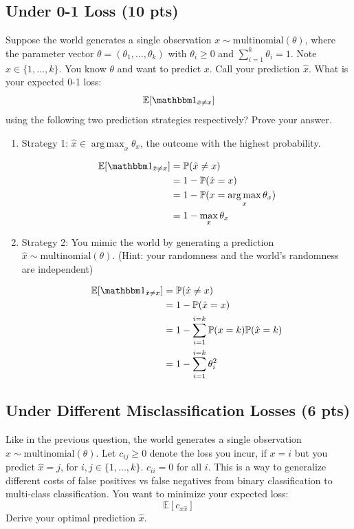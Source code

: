 \documentclass[a4paper]{article}
\theoremstyle{definition}
\DeclareMathOperator*{\argmax}{arg\,max}
\def\E{\mathbb E}
\def\ind{\mathbbm 1}
\newenvironment{soln}{
    \leavevmode\color{blue}\ignorespaces
}{}
\begin{document}
\subsection{Under 0-1 Loss (10 pts)}
Suppose the world generates a single observation $x \sim \mbox{multinomial}(\theta)$, where the parameter vector $\theta=(\theta_1, \ldots, \theta_k)$ with $\theta_i\ge 0$ and $\sum_{i=1}^k \theta_i=1$.  Note $x \in \{1, \ldots, k\}$.
You know $\theta$ and want to predict $x$. 
Call your prediction $\hat x$.  What is your expected 0-1 loss: 
$$\E[\ind_{\hat x \neq x}]$$
using the following two prediction strategies respectively?  Prove your answer.
\begin{enumerate}
    \item Strategy 1: $\hat x \in \argmax_x \theta_x$, the outcome with the highest probability.
    \begin{soln}
        \begin{align*}
            \E[\ind_{\hat x \neq x}] &= \mathbb{P}(\hat{x}\neq x)\\
            &= 1 - \mathbb{P}(\hat{x}= x)\\
            &= 1 - \mathbb{P}(x= \argmax_x \theta_x)\\
            &= 1 - \max_x \theta_x
        \end{align*}
    \end{soln}
    \item Strategy 2: You mimic the world by generating a prediction $\hat x \sim \mbox{multinomial}(\theta)$.  (Hint: your randomness and the world's randomness are independent)
    \begin{soln}
        \begin{align*}
            \E[\ind_{\hat x \neq x}] &= \mathbb{P}(\hat{x}\neq x)\\
            &= 1 - \mathbb{P}(\hat{x}= x)\\
            &= 1 - \sum_{i=1}^{i=k}\mathbb{P}(x= k)\mathbb{P}(\hat{x}= k)\\
            &= 1 - \sum_{i=1}^{i=k}\theta_i^2
        \end{align*}
    \end{soln}
\end{enumerate}

\subsection{Under Different Misclassification Losses (6 pts)}
Like in the previous question, the world generates a single observation $x \sim \mbox{multinomial}(\theta)$. Let $c_{ij} \ge 0$ denote the loss you incur, if $x=i$ but you predict $\hat x=j$, for $i,j \in \{1, \ldots, k\}$.
$c_{ii}=0$ for all $i$. This is a way to generalize different costs of false positives vs false negatives from binary classification to multi-class classification. You want to minimize your expected loss:
$$\E[c_{x \hat x}]$$
Derive your optimal prediction $\hat x$.
\end{document}
